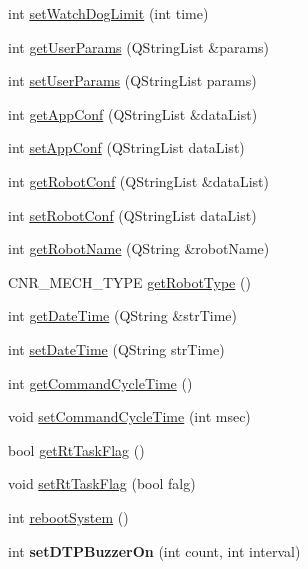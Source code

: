 \begin{DoxyCompactItemize}
int \hyperlink{classCNRobo_a8a8041d3173db9920ff8796d277baded}{set\-Watch\-Dog\-Limit} (int time)
\item 
int \hyperlink{classCNRobo_a3e2b802b3d8f528d938f0104b4f560df}{get\-User\-Params} (Q\-String\-List \&params)
\item 
int \hyperlink{classCNRobo_a35adcfa0a86522491eb05d9f4036152c}{set\-User\-Params} (Q\-String\-List params)
\item 
int \hyperlink{classCNRobo_aa664566dab42ce56b4f4367013554891}{get\-App\-Conf} (Q\-String\-List \&data\-List)
\item 
int \hyperlink{classCNRobo_ab1751a37575c2cfebaf9dc398807cb62}{set\-App\-Conf} (Q\-String\-List data\-List)
\item 
int \hyperlink{classCNRobo_a076c551d4fdab97323ad34fbdbafde85}{get\-Robot\-Conf} (Q\-String\-List \&data\-List)
\item 
int \hyperlink{classCNRobo_a7269644c73d7562fd6c6525ce2ca5c7c}{set\-Robot\-Conf} (Q\-String\-List data\-List)
\item 
int \hyperlink{classCNRobo_a3a23973e3e6815968717794e2ba217f3}{get\-Robot\-Name} (Q\-String \&robot\-Name)
\item 
C\-N\-R\-\_\-\-M\-E\-C\-H\-\_\-\-T\-Y\-P\-E \hyperlink{classCNRobo_aad9421e67804193f2a17ab97b59790b2}{get\-Robot\-Type} ()
\item 
int \hyperlink{classCNRobo_a8d52222f971273475c592f88809bb871}{get\-Date\-Time} (Q\-String \&str\-Time)
\item 
int \hyperlink{classCNRobo_a9642c198a3ba11069d49452eb810ed7d}{set\-Date\-Time} (Q\-String str\-Time)
\item 
int \hyperlink{classCNRobo_a5ea5ae449afe272e3e3f013ae7395408}{get\-Command\-Cycle\-Time} ()
\item 
void \hyperlink{classCNRobo_a0b466068fd0ddc9a65190a284bb19a70}{set\-Command\-Cycle\-Time} (int msec)
\item 
bool \hyperlink{classCNRobo_a2c5c236037b9558296e47703ccde3e0f}{get\-Rt\-Task\-Flag} ()
\item 
void \hyperlink{classCNRobo_a2d1dfcc8c56f78413dad4201920a4201}{set\-Rt\-Task\-Flag} (bool falg)
\item 
int \hyperlink{classCNRobo_a2db0f95b1b6ba77dfd43f676a6cd10b3}{reboot\-System} ()
\item 
\hypertarget{classCNRobo_acfa7fa157d7a74223699ef264e1e0dba}{int {\bfseries set\-D\-T\-P\-Buzzer\-On} (int count, int interval)}\label{classCNRobo_acfa7fa157d7a74223699ef264e1e0dba}


\end{DoxyCompactItemize}
